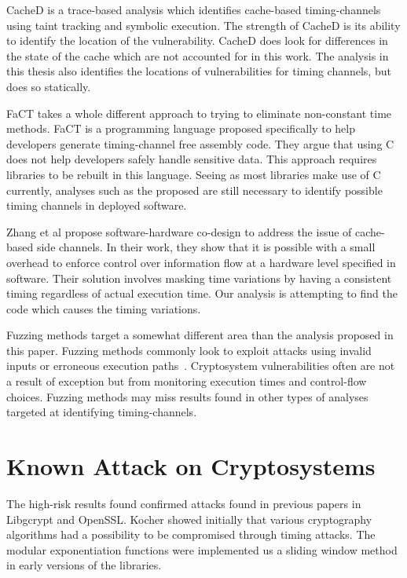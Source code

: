    CacheD is a trace-based analysis which identifies cache-based timing-channels
   using taint tracking and symbolic execution\cite{wang2017cached}. The
   strength of CacheD is its ability to identify the location of the
   vulnerability. CacheD does look for differences in the state of the cache
   which are not accounted for in this work. The analysis in this thesis also
   identifies the locations of vulnerabilities for timing channels, but does so
   statically.

   FaCT takes a whole different approach to trying to eliminate non-constant
   time methods\cite{cauligi2017fact}. FaCT is a programming language proposed
   specifically to help developers generate timing-channel free assembly code.
   They argue that using C does not help developers safely handle sensitive
   data. This approach requires libraries to be rebuilt in this language. Seeing
   as most libraries make use of C currently, analyses such as the proposed are
   still necessary to identify possible timing channels in deployed software.
   
   Zhang et al propose software-hardware co-design to address the issue of
   cache-based side channels\cite{zhang2015hardware}. In their work, they show
   that it is possible with a small overhead to enforce control over information
   flow at a hardware level specified in software. Their solution involves
   masking time variations by having a consistent timing regardless of actual
   execution time. Our analysis is attempting to find the code which causes the
   timing variations.
   
   Fuzzing methods target a somewhat different area than the analysis proposed
   in this paper. Fuzzing methods commonly look to exploit attacks using invalid
   inputs or erroneous execution paths~\cite{sutton2007fuzzing}. Cryptosystem vulnerabilities often are
   not a result of exception but from monitoring execution times and
   control-flow choices. Fuzzing methods may miss results found in other types
   of analyses targeted at identifying timing-channels.
 
\section{Known Attack on Cryptosystems}
   The high-risk results found confirmed attacks found in previous papers in
   Libgcrypt and OpenSSL. Kocher showed initially that various cryptography
   algorithms had a possibility to be compromised through timing
   attacks\cite{kochertiming}. The modular exponentiation functions were
   implemented us a sliding window method in early versions of the libraries. 

